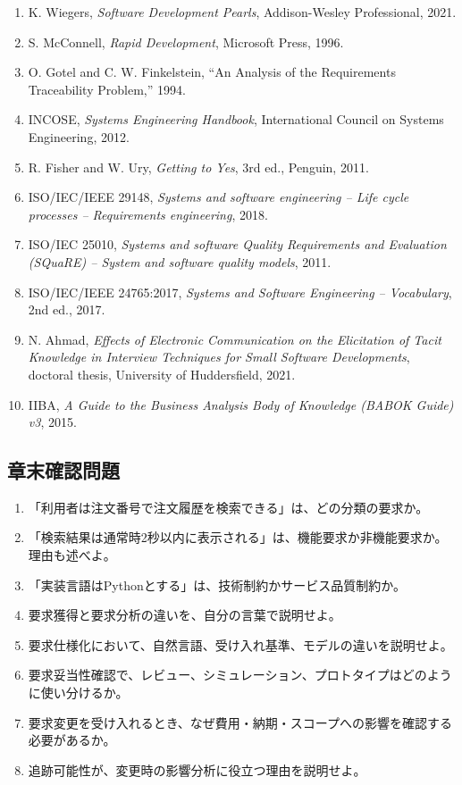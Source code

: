 \documentclass[a4paper,11pt]{ltjsarticle}
\numberwithin{figure}{section}
\numberwithin{table}{section}
\begin{document}
\begin{enumerate}[leftmargin=2.2em,itemsep=.15ex]
\item K. Wiegers, \textit{Software Development Pearls}, Addison-Wesley Professional, 2021.
\item S. McConnell, \textit{Rapid Development}, Microsoft Press, 1996.
\item O. Gotel and C. W. Finkelstein, ``An Analysis of the Requirements Traceability Problem,'' 1994.
\item INCOSE, \textit{Systems Engineering Handbook}, International Council on Systems Engineering, 2012.
\item R. Fisher and W. Ury, \textit{Getting to Yes}, 3rd ed., Penguin, 2011.
\item ISO/IEC/IEEE 29148, \textit{Systems and software engineering -- Life cycle processes -- Requirements engineering}, 2018.
\item ISO/IEC 25010, \textit{Systems and software Quality Requirements and Evaluation (SQuaRE) -- System and software quality models}, 2011.
\item ISO/IEC/IEEE 24765:2017, \textit{Systems and Software Engineering -- Vocabulary}, 2nd ed., 2017.
\item N. Ahmad, \textit{Effects of Electronic Communication on the Elicitation of Tacit Knowledge in Interview Techniques for Small Software Developments}, doctoral thesis, University of Huddersfield, 2021.
\item IIBA, \textit{A Guide to the Business Analysis Body of Knowledge (BABOK Guide) v3}, 2015.
\end{enumerate}
\normalsize

\subsection{章末確認問題}

\begin{enumerate}
\item 「利用者は注文番号で注文履歴を検索できる」は、どの分類の要求か。
\item 「検索結果は通常時2秒以内に表示される」は、機能要求か非機能要求か。理由も述べよ。
\item 「実装言語はPythonとする」は、技術制約かサービス品質制約か。
\item 要求獲得と要求分析の違いを、自分の言葉で説明せよ。
\item 要求仕様化において、自然言語、受け入れ基準、モデルの違いを説明せよ。
\item 要求妥当性確認で、レビュー、シミュレーション、プロトタイプはどのように使い分けるか。
\item 要求変更を受け入れるとき、なぜ費用・納期・スコープへの影響を確認する必要があるか。
\item 追跡可能性が、変更時の影響分析に役立つ理由を説明せよ。
\end{enumerate}
\end{document}
